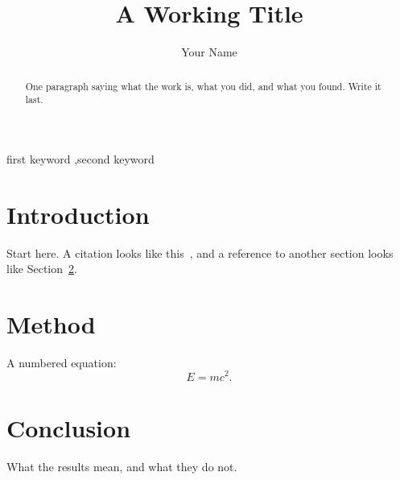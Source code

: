 \documentclass[preprint,12pt]{elsarticle}
\begin{document}
\begin{frontmatter}

\title{A Working Title}

\author[inst]{Your Name}

\begin{abstract}
One paragraph saying what the work is, what you did, and what you found.
Write it last.
\end{abstract}

\begin{keyword}
first keyword \sep second keyword
\end{keyword}

\end{frontmatter}

\section{Introduction}
\label{sec:introduction}

Start here.  A citation looks like this~\cite{knuth1984}, and a reference to
another section looks like Section~\ref{sec:method}.

\section{Method}
\label{sec:method}

A numbered equation:
\begin{equation}
  \label{eq:example}
  E = mc^2.
\end{equation}

\section{Conclusion}

What the results mean, and what they do not.



\end{document}
